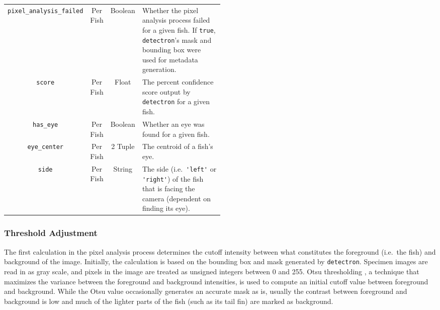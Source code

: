 \documentclass[conference]{IEEEtran}
\begin{document}
\begin{table}[t]
\begin{tabular}{cccp{0.5\linewidth}}
        \verb|pixel_analysis_failed| & Per Fish & Boolean & Whether the pixel analysis process failed for a given fish. If \verb|true|, \verb|detectron|'s mask and bounding box were used for metadata generation.\\
        \verb|score| & Per Fish & Float & The percent confidence score output by \verb|detectron| for a given fish.\\
        \verb|has_eye| & Per Fish & Boolean & Whether an eye was found for a given fish.\\
        \verb|eye_center| & Per Fish & 2 Tuple & The centroid of a fish's eye.\\
        \verb|side| & Per Fish & String & The side (i.e.\ \verb|'left'| or \verb|'right'|) of the fish that is facing the camera (dependent on finding its eye).\\
      \bottomrule
\end{tabular}
\end{table}

\subsubsection{Threshold Adjustment}
The first calculation in the pixel analysis process determines the cutoff intensity between what constitutes the foreground (i.e.~the fish) and background of the image.
Initially, the calculation is based on the bounding box and mask generated by
\verb|detectron|. Specimen images are read in as gray scale, and pixels in the image are treated as unsigned integers between 0 and 255.
Otsu thresholding \cite{Otsu1979ATS}, a technique that maximizes the variance between the 
foreground and background intensities, is used to compute an initial cutoff value between foreground and background. 
While the Otsu value occasionally generates an accurate mask as is, usually
the contrast between foreground and background is low and much of the lighter parts of the fish (such as its tail fin) are marked as background.
\end{document}
